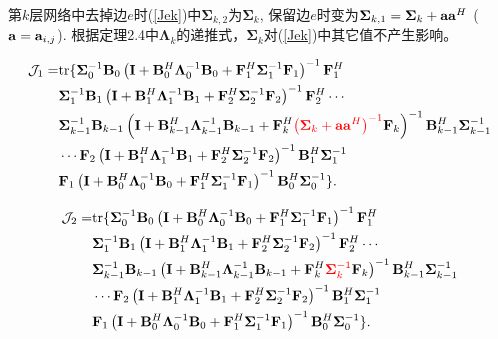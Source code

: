 \documentclass[a4paper,11pt]{article}
\newcommand\V[1]{\mathrm{\bf{#1}}}
\newcommand\Tx[1]{\mathrm{#1}}
\newcommand\Se[1]{\mathcal{#1}}
\newcommand\SB[1]{\left(#1\right)}
\begin{document}
第$k$层网络中去掉边$e$时(\ref{Jek})中$\bm{\Sigma}_{k,2}$为$\bm{\Sigma}_k$, 保留边$e$时变为$\bm{\Sigma}_{k,1}=\bm{\Sigma}_k+\V{a}\V{a}^H$ ($\V{a}=\V{a}_{i,j}$). 根据定理2.4中$\bm{\Lambda}_k$的递推式，$\bm{\Sigma}_k$对(\ref{Jek})中其它值不产生影响。

\begin{equation}
\begin{split}
\Se{J}_1=&\Tx{tr}\{\bm{\Sigma}_{0}^{-1}\V{B}_{0}\SB{\V{I}+\V{B}_{0}^H\bm{\Lambda}_0^{-1}\V{B}_{0}+\V{F}_{1}^H\bm{\Sigma}_{1}^{-1}\V{F}_{1}}^{-1}\V{F}_{1}^H\\
&\bm{\Sigma}_{1}^{-1}\V{B}_{1}\SB{\V{I}+\V{B}_{1}^H\bm{\Lambda}_{1}^{-1}\V{B}_{1}+\V{F}_{2}^H\bm{\Sigma}_{2}^{-1}\V{F}_{2}}^{-1}\V{F}_{2}^H\cdots\\
&\bm{\Sigma}_{k-1}^{-1}\V{B}_{k-1}\SB{\V{I}+\V{B}_{k-1}^H\bm{\Lambda}_{k-1}^{-1}\V{B}_{k-1}+\V{F}_{k}^H\textcolor{red}{\SB{\bm{\Sigma}_{k}+\V{a}\V{a}^H}^{-1}}\V{F}_{k}}^{-1}\V{B}_{k-1}^H\bm{\Sigma}_{k-1}^{-1}\\
&\cdots \V{F}_{2}\SB{\V{I}+\V{B}_{1}^H\bm{\Lambda}_{1}^{-1}\V{B}_{1}+\V{F}_{2}^H\bm{\Sigma}_{2}^{-1}\V{F}_{2}}^{-1}\V{B}_{1}^H\bm{\Sigma}_{1}^{-1}\\
&\V{F}_{1}\SB{\V{I}+\V{B}_{0}^H\bm{\Lambda}_0^{-1}\V{B}_{0}+\V{F}_{1}^H\bm{\Sigma}_{1}^{-1}\V{F}_{1}}^{-1}\V{B}_{0}^H\bm{\Sigma}_{0}^{-1}\}.
\end{split}
\end{equation}

\begin{equation}
\begin{split}
\Se{J}_2=&\Tx{tr}\{\bm{\Sigma}_{0}^{-1}\V{B}_{0}\SB{\V{I}+\V{B}_{0}^H\bm{\Lambda}_0^{-1}\V{B}_{0}+\V{F}_{1}^H\bm{\Sigma}_{1}^{-1}\V{F}_{1}}^{-1}\V{F}_{1}^H\\
&\bm{\Sigma}_{1}^{-1}\V{B}_{1}\SB{\V{I}+\V{B}_{1}^H\bm{\Lambda}_{1}^{-1}\V{B}_{1}+\V{F}_{2}^H\bm{\Sigma}_{2}^{-1}\V{F}_{2}}^{-1}\V{F}_{2}^H\cdots\\
&\bm{\Sigma}_{k-1}^{-1}\V{B}_{k-1}\SB{\V{I}+\V{B}_{k-1}^H\bm{\Lambda}_{k-1}^{-1}\V{B}_{k-1}+\V{F}_{k}^H\textcolor{red}{\bm{\Sigma}_{k}^{-1}}\V{F}_{k}}^{-1}\V{B}_{k-1}^H\bm{\Sigma}_{k-1}^{-1}\\
&\cdots \V{F}_{2}\SB{\V{I}+\V{B}_{1}^H\bm{\Lambda}_{1}^{-1}\V{B}_{1}+\V{F}_{2}^H\bm{\Sigma}_{2}^{-1}\V{F}_{2}}^{-1}\V{B}_{1}^H\bm{\Sigma}_{1}^{-1}\\
&\V{F}_{1}\SB{\V{I}+\V{B}_{0}^H\bm{\Lambda}_0^{-1}\V{B}_{0}+\V{F}_{1}^H\bm{\Sigma}_{1}^{-1}\V{F}_{1}}^{-1}\V{B}_{0}^H\bm{\Sigma}_{0}^{-1}\}.
\end{split}
\end{equation}
\end{document}
